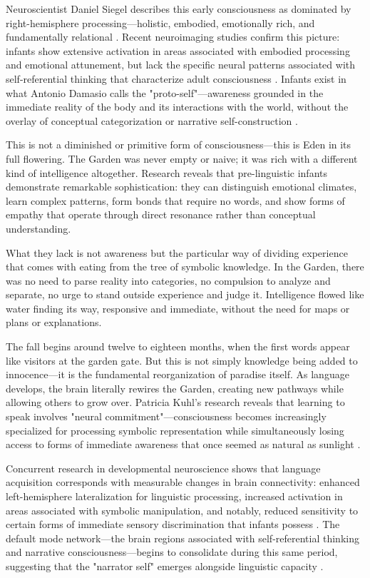 Neuroscientist Daniel Siegel describes this early consciousness as dominated by right-hemisphere processing—holistic, embodied, emotionally rich, and fundamentally relational \parencite{siegel2012mind}. Recent neuroimaging studies confirm this picture: infants show extensive activation in areas associated with embodied processing and emotional attunement, but lack the specific neural patterns associated with self-referential thinking that characterize adult consciousness \parencite{gao2009evidence,gao2017development}. Infants exist in what Antonio Damasio calls the "proto-self"—awareness grounded in the immediate reality of the body and its interactions with the world, without the overlay of conceptual categorization or narrative self-construction \parencite{damasio1999feeling}.

This is not a diminished or primitive form of consciousness—this is Eden in its full flowering. The Garden was never empty or naive; it was rich with a different kind of intelligence altogether. Research reveals that pre-linguistic infants demonstrate remarkable sophistication: they can distinguish emotional climates, learn complex patterns, form bonds that require no words, and show forms of empathy that operate through direct resonance rather than conceptual understanding.

What they lack is not awareness but the particular way of dividing experience that comes with eating from the tree of symbolic knowledge. In the Garden, there was no need to parse reality into categories, no compulsion to analyze and separate, no urge to stand outside experience and judge it. Intelligence flowed like water finding its way, responsive and immediate, without the need for maps or plans or explanations.

The fall begins around twelve to eighteen months, when the first words appear like visitors at the garden gate. But this is not simply knowledge being added to innocence—it is the fundamental reorganization of paradise itself. As language develops, the brain literally rewires the Garden, creating new pathways while allowing others to grow over. Patricia Kuhl's research reveals that learning to speak involves "neural commitment"—consciousness becomes increasingly specialized for processing symbolic representation while simultaneously losing access to forms of immediate awareness that once seemed as natural as sunlight \parencite{kuhl2004early,kuhl2010brain}. 

Concurrent research in developmental neuroscience shows that language acquisition corresponds with measurable changes in brain connectivity: enhanced left-hemisphere lateralization for linguistic processing, increased activation in areas associated with symbolic manipulation, and notably, reduced sensitivity to certain forms of immediate sensory discrimination that infants possess \parencite{werker1984cross,sebastiangalles2012early}. The default mode network—the brain regions associated with self-referential thinking and narrative consciousness—begins to consolidate during this same period, suggesting that the "narrator self" emerges alongside linguistic capacity \parencite{fair2008development}.

